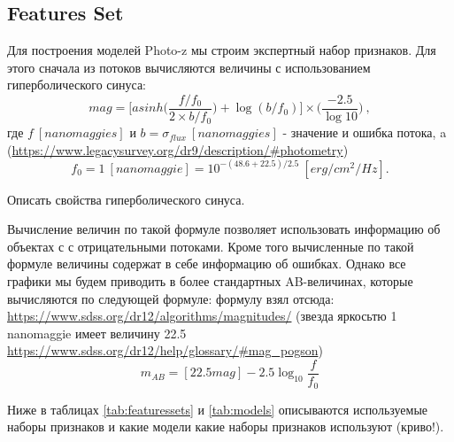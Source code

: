 \documentclass[fleqn,usenatbib]{mnras}
\begin{document}
\subsection{Features Set}
Для построения моделей Photo-z мы строим экспертный набор признаков. Для этого сначала из потоков вычисляются величины с использованием гиперболического синуса:
\begin{equation}\label{eq:asinhmag}
    mag = \Bigg[asinh\Bigg(\frac{f/f_0}{2 \times b/f_0}\Bigg) + \log(b/f_0)\Bigg] \times \Bigg(\frac{-2.5}{\log 10}\Bigg) ~,
\end{equation}
где $f~[nanomaggies]$ и $b = \sigma_{flux}~[nanomaggies]$ - значение и ошибка потока, a (\url{https://www.legacysurvey.org/dr9/description/#photometry})
\begin{equation}
    f_0 = 1~[nanomaggie] = 10^{-(48.6+22.5)/2.5}~[erg/cm^2/Hz].
\end{equation}

Описать свойства гиперболического синуса.

Вычисление величин по такой формуле позволяет использовать информацию об объектах с с отрицательными потоками. Кроме того вычисленные по такой формуле величины содержат в себе информацию об ошибках. Однако все графики мы будем приводить в более стандартных AB-величинах, которые вычисляются по следующей формуле: формулу взял отсюда: \url{https://www.sdss.org/dr12/algorithms/magnitudes/} (звезда яркосьтю 1 nanomaggie имеет величину 22.5 \url{https://www.sdss.org/dr12/help/glossary/#mag_pogson})
\begin{equation}\label{eq:mag_ab}
    m_{AB} = [22.5 mag] - 2.5 \log_{10} \frac{f}{f_0}
\end{equation}

Ниже в таблицах \ref{tab:featuressets} и \ref{tab:models} описываются используемые наборы признаков и какие модели какие наборы признаков используют (криво!). 
\end{document}
